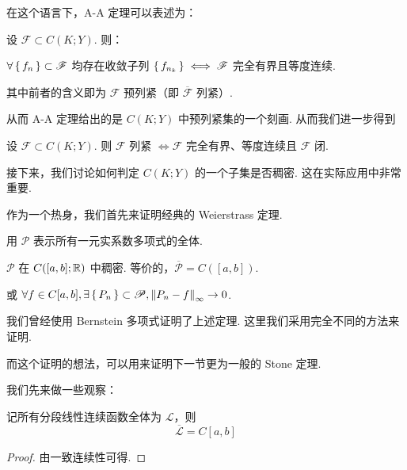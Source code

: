在这个语言下，A-A 定理可以表述为：

\begin{property}
    设 $\mathscr{F}\subset C(K;Y)$. 则：
    
    $\forall\set{f_n}\subset\mathscr{F}$ 均存在收敛子列 $\set{f_{n_k}}\iff\mathscr{F}$ 完全有界且等度连续.
\end{property}

其中前者的含义即为 $\mathscr{F}$ 预列紧（即 $\overline{\mathscr{F}}$ 列紧）.

从而 A-A 定理给出的是 $C(K;Y)$ 中预列紧集的一个刻画. 从而我们进一步得到

\begin{property}
    设 $\mathscr{F}\subset C(K;Y)$. 则 $\mathscr{F}$ 列紧 $\iff\mathscr{F}$ 完全有界、等度连续且 $\mathscr{F}$ 闭.
\end{property}

接下来，我们讨论如何判定 $C(K;Y)$ 的一个子集是否稠密. 这在实际应用中非常重要.

作为一个热身，我们首先来证明经典的 Weierstrass 定理.

用 $\mathscr{P}$ 表示所有一元实系数多项式的全体.

\begin{theorem}[Weierstrass]
    $\mathscr{P}$ 在 $C([a,b];\mathbb{R})$ 中稠密. 等价的，$\overline{\mathscr{P}}=C([a,b])$.

    或 $\forall f\in C[a,b],\exists\set{P_n}\subset\mathscr{P},\left\lVert{P_n-f}\right\rVert_\infty\to 0$.
\end{theorem}

\begin{hint}
    我们曾经使用 Bernstein 多项式证明了上述定理. 这里我们采用完全不同的方法来证明.

    而这个证明的想法，可以用来证明下一节更为一般的 Stone 定理.
\end{hint}

我们先来做一些观察：

\begin{lemma}
    记所有分段线性连续函数全体为 $\mathscr{L}$，则
$$
\overline{\mathscr{L}}=C[a,b]
$$
\end{lemma}
\begin{proof}
    由一致连续性可得.
\end{proof}

\begin{center}
\end{center}

